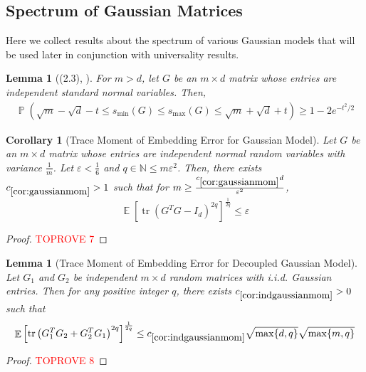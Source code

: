 \documentclass[11pt]{amsart}
\numberwithin{equation}{section}
\numberwithin{equation}{section}
\DeclareMathOperator{\E}{\mathbb{E}}
\DeclareMathOperator{\Pb}{\mathbb{P}}
\DeclareMathOperator*{\tr}{tr}
\newtheorem{corollary}[theorem]{Corollary}
\newtheorem{lemma}[theorem]{Lemma}
\theoremstyle{remark}
\theoremstyle{definition}
\begin{document}
\subsection{Spectrum of Gaussian Matrices}
Here we collect results about the spectrum of various Gaussian models that will be used later in conjunction with universality results.



   \begin{lemma}[(2.3), \cite{rudelson2010non}]\label{lem:Gaussianspectrum}
    For $m>d$, let $G$ be an $m \times d$ matrix whose entries are independent standard normal variables. Then,
    \begin{align*}
        \Pb(\sqrt{m}-\sqrt{d}-t \leq s_{\min}(G) \leq s_{\max}(G) \leq \sqrt{m}+\sqrt{d}+t) \geq 1 - 2e^{-t^2/2}
    \end{align*}
\end{lemma}

\begin{corollary}[Trace Moment of Embedding Error for Gaussian Model] \label{cor:gaussianmom}
    Let $G$ be an $m \times d$ matrix whose entries are independent normal random variables with variance $\frac{1}{m}$. Let $\varepsilon<\frac{1}{6}$ and $q \in \mathbb{N} \le m \varepsilon^2 $. Then, there exists $c_{\ref*{cor:gaussianmom}} > 1$ such that for $m \geq \frac{c_{\ref*{cor:gaussianmom}}d}{\varepsilon^2}$,
    \[ \E[\tr(G^TG - I_d)^{2q}]^\frac{1}{2q} \leq  \varepsilon \]
    
\end{corollary}

\begin{proof}\textcolor{red}{TOPROVE 7}\end{proof} 



\begin{lemma}[Trace Moment of Embedding Error for Decoupled Gaussian Model]\label{cor:indgaussianmom}
    Let $G_1$ and $G_2$ be independent $m \times d$ random matrices with i.i.d. Gaussian entries. Then for any positive integer $q$, there exists $c_{\ref*{cor:indgaussianmom}}>0$ such that 
    \[ \E \left[ \tr \left( G_1^TG_2 + G_2^TG_1 \right)^{2q} \right]^\frac{1}{2q} \le c_{\ref*{cor:indgaussianmom}}\sqrt{\max\{d, q\}}\sqrt{\max\{m, q\}}\]
    
\end{lemma}

\begin{proof}\textcolor{red}{TOPROVE 8}\end{proof}
\end{document}
